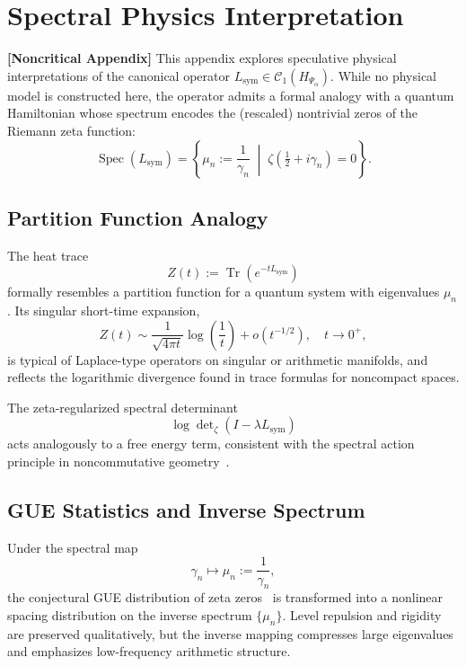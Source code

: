 \section{Spectral Physics Interpretation}
\label{app:spectral-physics-link}

\noindent\textbf{[Noncritical Appendix]}  
This appendix explores speculative physical interpretations of the canonical operator \( L_{\mathrm{sym}} \in \mathcal{C}_1(H_{\Psi_\alpha}) \). While no physical model is constructed here, the operator admits a formal analogy with a quantum Hamiltonian whose spectrum encodes the (rescaled) nontrivial zeros of the Riemann zeta function:
\[
\operatorname{Spec}(L_{\mathrm{sym}}) = \left\{ \mu_n := \frac{1}{\gamma_n} \;\middle|\; \zeta\left(\tfrac{1}{2} + i\gamma_n\right) = 0 \right\}.
\]

\subsection*{Partition Function Analogy}

The heat trace
\[
Z(t) := \operatorname{Tr}(e^{-t L_{\mathrm{sym}}})
\]
formally resembles a partition function for a quantum system with eigenvalues \( \mu_n \). Its singular short-time expansion,
\[
Z(t) \sim \frac{1}{\sqrt{4\pi t}} \log\left( \frac{1}{t} \right) + o(t^{-1/2}), \quad t \to 0^+,
\]
is typical of Laplace-type operators on singular or arithmetic manifolds, and reflects the logarithmic divergence found in trace formulas for noncompact spaces.

The zeta-regularized spectral determinant
\[
\log \det\nolimits_\zeta(I - \lambda L_{\mathrm{sym}})
\]
acts analogously to a free energy term, consistent with the spectral action principle in noncommutative geometry~\cite{Connes1999TraceFormula, Chamseddine2007SpectralAction}.

\subsection*{GUE Statistics and Inverse Spectrum}

Under the spectral map
\[
\gamma_n \longmapsto \mu_n := \frac{1}{\gamma_n},
\]
the conjectural GUE distribution of zeta zeros~\cite{Montgomery1973PairCorrelation, Berry1986RiemannSpectra} is transformed into a nonlinear spacing distribution on the inverse spectrum \( \{ \mu_n \} \). Level repulsion and rigidity are preserved qualitatively, but the inverse mapping compresses large eigenvalues and emphasizes low-frequency arithmetic structure.

